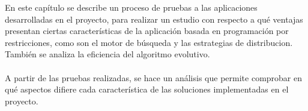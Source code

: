 En este capítulo se describe un proceso de pruebas a las aplicaciones desarrolladas en el proyecto, para realizar un estudio con respecto a qué ventajas presentan ciertas características de la aplicación basada en programación por restricciones, como son el motor de búsqueda y las estrategias de distribucion. También se analiza la eficiencia del algoritmo evolutivo.\\\\
A partir de las pruebas realizadas, se hace un análisis que permite comprobar en qué aspectos difiere cada característica de las soluciones implementadas en el proyecto.
